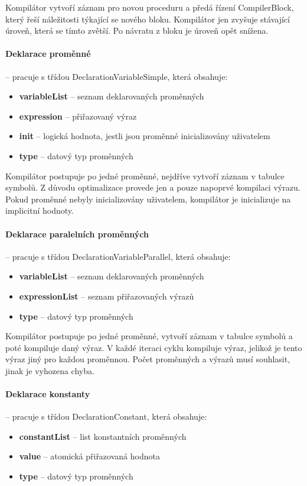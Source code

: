 \documentclass[
12pt,
a4paper,
pdftex,
czech,
titlepage
]{report}
\begin{document}
Kompilátor vytvoří záznam pro novou proceduru a předá řízení CompilerBlock, který řeší náležitosti týkající se nového bloku. Kompilátor jen zvyšuje stávající úroveň, která se tímto zvětší. Po návratu z bloku je úroveň opět snížena.

\paragraph{Deklarace proměnné} -- pracuje s třídou DeclarationVariableSimple, která obsahuje:
\begin{itemize}
\item \textbf{variableList} -- seznam deklarovaných proměnných
\item \textbf{expression} -- přiřazovaný výraz
\item \textbf{init} -- logická hodnota, jestli jsou proměnné inicializovány uživatelem
\item \textbf{type} -- datový typ proměnných
\end{itemize} 

Kompilátor postupuje po jedné proměnné, nejdříve vytvoří záznam v tabulce symbolů. Z důvodu optimalizace provede jen a pouze napoprvé kompilaci výrazu. Pokud proměnné nebyly inicializovány uživatelem, kompilátor je inicializuje na implicitní hodnoty.

\paragraph{Deklarace paralelních proměnných} -- pracuje s třídou DeclarationVariableParallel, která obsahuje:
\begin{itemize}
\item \textbf{variableList} -- seznam deklarovaných proměnných
\item \textbf{expressionList} -- seznam přiřazovaných výrazů
\item \textbf{type} -- datový typ proměnných
\end{itemize}

Kompilátor postupuje po jedné proměnné, vytvoří záznam v tabulce symbolů a poté kompiluje daný výraz. V každé iteraci cyklu kompiluje výraz, jelikož je tento výraz jiný pro každou proměnnou. Počet proměnných a výrazů musí souhlasit, jinak je vyhozena chyba.

\paragraph{Deklarace konstanty} -- pracuje s třídou DeclarationConstant, která obsahuje:
\begin{itemize}
\item \textbf{constantList} -- list konstantních proměnných
\item \textbf{value} -- atomická přiřazovaná hodnota
\item \textbf{type} -- datový typ proměnných
\end{itemize}
\end{document}
